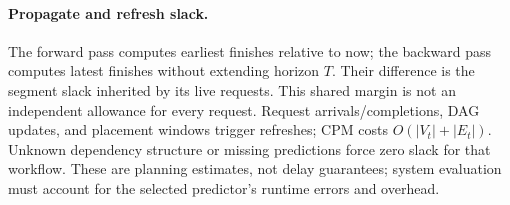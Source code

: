 \paragraph{Propagate and refresh slack.}
The forward pass computes earliest finishes relative to now; the
backward pass computes latest finishes without extending horizon $T$.
Their difference is the segment slack inherited by its live requests.
This shared margin is not an independent allowance for every request.
Request arrivals/completions, DAG updates, and placement windows trigger
refreshes; CPM costs $O(|V_t|+|E_t|)$. Unknown dependency structure or missing
predictions force zero slack for that workflow. These are planning
estimates, not delay guarantees; system evaluation must account for
the selected predictor's runtime errors and overhead.
